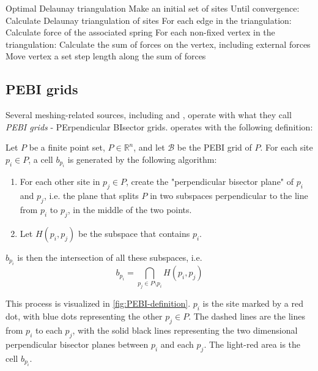 \begin{pseudocode}[label=alg:delaunay_force]{Optimal Delaunay triangulation}
    Make an initial set of sites
    Until convergence:
        Calculate Delaunay triangulation of sites
        For each edge in the triangulation:
            Calculate force of the associated spring
        For each non-fixed vertex in the triangulation:
            Calculate the sum of forces on the vertex, including external forces
            Move vertex a set step length along the sum of forces
\end{pseudocode}

\subsection{PEBI grids}
Several meshing-related sources, including \cite{UPR_chapter} and \cite{UPR_thesis}, operate with what they call \emph{PEBI grids} - PErpendicular BIsector grids. \textcite{UPR_thesis} operates with the following definition:

\begin{definition}
\label{def:PEBI-grid}
Let $P$ be a finite point set, $P \in \mathbb{R}^n$, and let $\mathcal{B}$ be the PEBI grid of $P$. For each site $p_i \in P$, a cell $b_{p_i}$ is generated by the following algorithm:
\begin{enumerate}
    \item For each other site in $p_j \in P$, create the "perpendicular bisector plane" of $p_i$ and $p_j$, i.e. the plane that splits $P$ in two subspaces perpendicular to the line from $p_i$ to $p_j$, in the middle of the two points.
    \item Let $H(p_i, p_j)$ be the subspace that contains $p_i$.
\end{enumerate}
$b_{p_i}$ is then the intersection of all these subspaces, i.e.
\begin{equation}
    b_{p_i} = \bigcap_{p_j \in P \setminus p_i} H(p_i, p_j)
\end{equation}
\end{definition}

This process is visualized in \autoref{fig:PEBI-definition}. $p_i$ is the site marked by a red dot, with blue dots representing the other $p_j \in P$. The dashed lines are the lines from $p_i$ to each $p_j$, with the solid black lines representing the two dimensional perpendicular bisector planes between $p_i$ and each $p_j$. The light-red area is the cell $b_{p_i}$.


